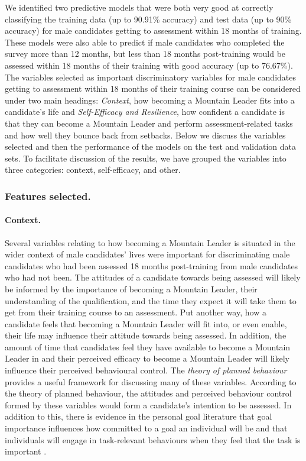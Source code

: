 \documentclass[
  12pt,
  a4paper,
]{book}
\begin{document}
We identified two predictive models that were both very good at correctly classifying the training data (up to 90.91\% accuracy) and test data (up to 90\% accuracy) for male candidates getting to assessment within 18 months of training. These models were also able to predict if male candidates who completed the survey more than 12 months, but less than 18 months post-training would be assessed within 18 months of their training with good accuracy (up to 76.67\%). The variables selected as important discriminatory variables for male candidates getting to assessment within 18 months of their training course can be considered under two main headings: \emph{Context}, how becoming a Mountain Leader fits into a candidate's life and \emph{Self-Efficacy and Resilience}, how confident a candidate is that they can become a Mountain Leader and perform assessment-related tasks and how well they bounce back from setbacks. Below we discuss the variables selected and then the performance of the models on the test and validation data sets. To facilitate discussion of the results, we have grouped the variables into three categories: context, self-efficacy, and other.

\hypertarget{features-selected.}{%
\subsubsection{Features selected.}\label{features-selected.}}

\hypertarget{context}{%
\paragraph{Context.}\label{context}}

Several variables relating to how becoming a Mountain Leader is situated in the wider context of male candidates' lives were important for discriminating male candidates who had been assessed 18 months post-training from male candidates who had not been. The attitudes of a candidate towards being assessed will likely be informed by the importance of becoming a Mountain Leader, their understanding of the qualification, and the time they expect it will take them to get from their training course to an assessment. Put another way, how a candidate feels that becoming a Mountain Leader will fit into, or even enable, their life may influence their attitude towards being assessed. In addition, the amount of time that candidates feel they have available to become a Mountain Leader in and their perceived efficacy to become a Mountain Leader will likely influence their perceived behavioural control. The \emph{theory of planned behaviour} \citep{Ajzen1991, Ajzen1986} provides a useful framework for discussing many of these variables. According to the theory of planned behaviour, the attitudes and perceived behaviour control formed by these variables would form a candidate's intention to be assessed. In addition to this, there is evidence in the personal goal literature that goal importance influences how committed to a goal an individual will be \citep{Gollwitzer1993} and that individuals will engage in task-relevant behaviours when they feel that the task is important \citep[e.g.,][]{Ingledew2005, Yukl1999, Yukl1996}.
\end{document}
